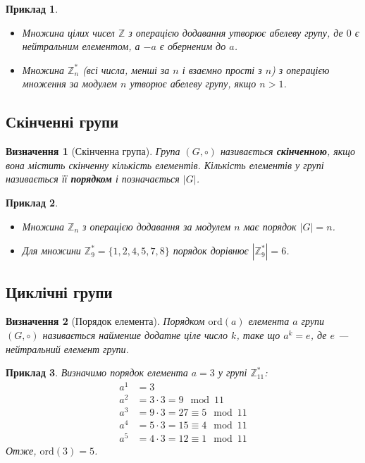 \documentclass[12pt]{report}
\newtheorem{definition}{Визначення}[chapter]
\newtheorem{example}{Приклад}[chapter]
\begin{document}
\begin{example}
\begin{itemize}
    \item Множина цілих чисел \( \mathbb{Z} \) з операцією додавання утворює абелеву групу, де \( 0 \) є нейтральним елементом, а \( -a \) є оберненим до \( a \).
    \item Множина \( \mathbb{Z}^*_n \) (всі числа, менші за \( n \) і взаємно прості з \( n \)) з операцією множення за модулем \( n \) утворює абелеву групу, якщо \( n > 1 \).
\end{itemize}
\end{example}

\subsection{Скінченні групи}

\begin{definition}[Скінченна група]
Група \( (G, \circ) \) називається \textbf{скінченною}, якщо вона містить скінченну кількість елементів. Кількість елементів у групі називається її \textbf{порядком} і позначається \( |G| \).
\end{definition}

\begin{example}
\begin{itemize}
    \item Множина \( \mathbb{Z}_n \) з операцією додавання за модулем \( n \) має порядок \( |G| = n \).
    \item Для множини \( \mathbb{Z}^*_9 = \{1, 2, 4, 5, 7, 8\} \) порядок дорівнює \( |\mathbb{Z}^*_9| = 6 \).
\end{itemize}
\end{example}

\subsection{Циклічні групи}

\begin{definition}[Порядок елемента]
Порядком \( \text{ord}(a) \) елемента \( a \) групи \( (G, \circ) \) називається найменше додатне ціле число \( k \), таке що \( a^k = e \), де \( e \) — нейтральний елемент групи.
\end{definition}

\begin{example}
Визначимо порядок елемента \( a = 3 \) у групі \( \mathbb{Z}^*_{11} \):
\[
\begin{aligned}
a^1 & = 3 \\
a^2 & = 3 \cdot 3 = 9 \mod 11 \\
a^3 & = 9 \cdot 3 = 27 \equiv 5 \mod 11 \\
a^4 & = 5 \cdot 3 = 15 \equiv 4 \mod 11 \\
a^5 & = 4 \cdot 3 = 12 \equiv 1 \mod 11
\end{aligned}
\]
Отже, \( \text{ord}(3) = 5 \).
\end{example}
\end{document}

